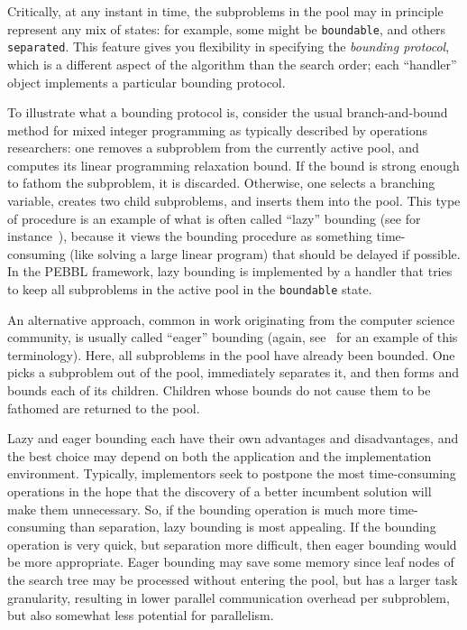Critically, at any instant in time, the subproblems in the pool may in
principle represent any mix of states: for example, some might be
\texttt{boundable}, and others \texttt{separated}.  This feature gives
you flexibility in specifying the \emph{bounding protocol}, which is a
different aspect of the algorithm than the search order; each
``handler'' object implements a particular bounding protocol.

To illustrate what a bounding protocol is, consider the usual
branch-and-bound method for mixed integer programming as typically
described by operations researchers: one removes a subproblem from the
currently active pool, and computes its linear programming relaxation
bound.  If the bound is strong enough to fathom the subproblem, it is
discarded.  Otherwise, one selects a branching variable, creates two
child subproblems, and inserts them into the pool.  This type of
procedure is an example of what is often called ``lazy'' bounding (see
for instance~\cite{CP99}), because it views the bounding procedure as
something time-consuming (like solving a large linear program) that
should be delayed if possible.  In the PEBBL framework, lazy bounding
is implemented by a handler that tries to keep all subproblems in the
active pool in the \texttt{boundable} state.

An alternative approach, common in work originating from the computer
science community, is usually called ``eager'' bounding (again,
see~\cite{CP99} for an example of this terminology).  Here, all
subproblems in the pool have already been bounded.  One picks a
subproblem out of the pool, immediately separates it,
and then forms and bounds each of its children.  Children whose bounds do
not cause them to be fathomed are returned to the pool.  

Lazy and eager bounding each have their own advantages and
disadvantages, and the best choice may depend on both the application
and the implementation environment.  Typically, implementors seek to
postpone the most time-consuming operations in the hope that the
discovery of a better incumbent solution will make them unnecessary.
So, if the bounding operation is much more time-consuming than
separation, lazy bounding is most appealing.  If the bounding
operation is very quick, but separation more difficult, then eager
bounding would be more appropriate.  Eager bounding may save some
memory since leaf nodes of the search tree may be processed without
entering the pool, but has a larger task granularity, resulting in
lower parallel communication overhead per subproblem, but also
somewhat less potential for parallelism.

